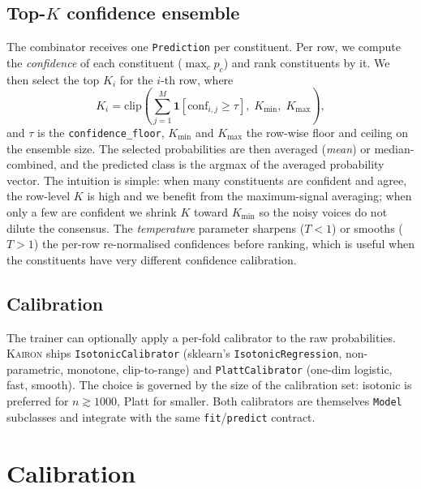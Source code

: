 \documentclass[11pt,a4paper]{article}
\let\oldsection\section
\renewcommand{\section}{\clearpage\oldsection}
\providecommand{\kairon}{\textsc{Kairon}}
\begin{document}
\subsection{Top-$K$ confidence ensemble}\label{sec:ens}
The combinator receives one \texttt{Prediction} per
constituent. Per row, we compute the
\emph{confidence} of each constituent
(\(\max_{c}p_{c}\)) and rank constituents by it. We then
select the top $K_i$ for the $i$-th row, where
\begin{equation}\label{eq:topk}
K_i = \mathrm{clip}\!\left(\sum_{j=1}^{M}\mathbf{1}\!\left[\mathrm{conf}_{i,j}\geq\tau\right],\;K_{\min},\;K_{\max}\right),
\end{equation}
and $\tau$ is the \texttt{confidence\_floor}, $K_{\min}$ and
$K_{\max}$ the row-wise floor and ceiling on the ensemble
size. The selected probabilities are then averaged
(\emph{mean}) or median-combined, and the predicted class is
the argmax of the averaged probability vector. The
intuition is simple: when many constituents are confident and
agree, the row-level $K$ is high and we benefit from the
maximum-signal averaging; when only a few are confident we
shrink $K$ toward $K_{\min}$ so the noisy voices do not
dilute the consensus. The \emph{temperature} parameter
sharpens ($T<1$) or smooths ($T>1$) the per-row
re-normalised confidences before ranking, which is useful when
the constituents have very different confidence calibration.

\subsection{Calibration}
The trainer can optionally apply a per-fold calibrator to
the raw probabilities. \kairon{} ships
\texttt{IsotonicCalibrator} (sklearn's
\texttt{IsotonicRegression}, non-parametric, monotone,
clip-to-range) and \texttt{PlattCalibrator} (one-dim
logistic, fast, smooth). The choice is governed by the size
of the calibration set: isotonic is preferred for $n\gtrsim 1000$,
Platt for smaller. Both calibrators are themselves
\texttt{Model} subclasses and integrate with the same
\texttt{fit}/\texttt{predict} contract.

\section{Calibration}\label{sec:cal}
\end{document}
